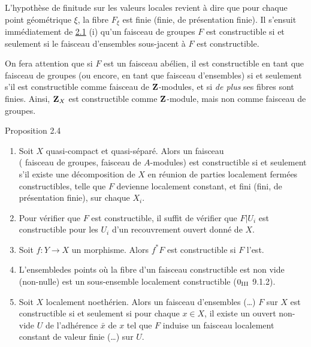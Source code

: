 \documentclass[10pt]{../fichiers-configuration-latex/smfart}
\begin{document}
\setcounter{subsection}{3}
\subsubsection{}
L'hypothèse de finitude sur les valeurs locales revient à dire que
pour chaque point géométrique $\xi$, la fibre $F_{\xi}$ est finie
(\resp finie, \resp de présentation finie). Il s'ensuit immédiatement
de \hyperref[IX.lem2.1]{2.1} (i) qu'un faisceau de groupes $F$ est constructible si et
seulement si le faisceau d'ensembles sous-jacent à $F$ est
constructible.

On fera attention que si $F$ est un faisceau abélien, il est
constructible en tant que faisceau de groupes (ou encore, en tant que
faisceau d'ensembles) si et seulement s'il est constructible comme
faisceau de $\mathbf{Z}$-modules, et si \emph{de plus} ses
fibres sont finies. Ainsi, $\mathbf{Z}_X$ est
constructible comme $\mathbf{Z}$-module, mais non comme
faisceau de groupes.

\begin{enonce*}{Proposition 2.4}
\begin{enumerate}
\renewcommand{\theenumi}{\roman{enumi}}
\renewcommand{\labelenumi}{(\theenumi)}
\item Soit $X$ quasi-compact et quasi-séparé. Alors un faisceau \\ (\resp
  faisceau de groupes, \resp faisceau de $A$-modules) est
  constructible si et seulement s'il existe une décomposition de $X$
  en réunion de parties localement fermées constructibles, telle que
  $F$ devienne localement constant, et fini (\resp fini, \resp de
  présentation finie), sur chaque $X_i$.

\item Pour vérifier que $F$ est constructible, il suffit de vérifier
  que $F| U_i$ est constructible pour les $U_i$ d'un recouvrement
  ouvert donné de $X$.

\item Soit $f:Y\rightarrow X$ un morphisme. Alors $f^{\ast}F$ est
  constructible si $F$ l'est.

\item L'ensemble\pageoriginale des points où la fibre d'un faisceau
  constructible est non vide (\resp non-nulle) est un sous-ensemble
  localement constructible {\rm (\EGA $0_{\rm III}$ 9.1.2)}.

\item Soit $X$ localement noethérien. Alors un faisceau d'ensembles
  (\resp\ldots) $F$ sur $X$ est constructible si et seulement si pour
  chaque $x\in X$, il existe un ouvert non-vide $U$ de l'adhérence
  $\bar{x}$ de $x$ tel que $F$ induise un faisceau localement constant
  de valeur finie (\resp\ldots) sur $U$.
\end{enumerate}
\end{enonce*}
\end{document}
